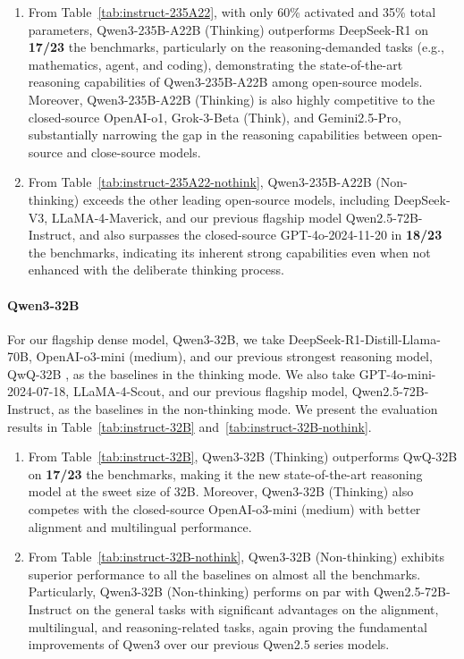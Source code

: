 \documentclass[dvipsnames]{article}
\begin{document}
\begin{enumerate}[label=(\arabic*)]
    \item From Table~\ref{tab:instruct-235A22}, with only 60\% activated and 35\% total parameters, Qwen3-235B-A22B (Thinking) outperforms DeepSeek-R1 on \textbf{17/23} the benchmarks, particularly on the reasoning-demanded tasks (e.g., mathematics, agent, and coding), demonstrating the state-of-the-art reasoning capabilities of Qwen3-235B-A22B among open-source models.
    Moreover, Qwen3-235B-A22B (Thinking) is also highly competitive to the closed-source OpenAI-o1, Grok-3-Beta (Think), and Gemini2.5-Pro, substantially narrowing the gap in the reasoning capabilities between open-source and close-source models.
    \item From Table~\ref{tab:instruct-235A22-nothink}, Qwen3-235B-A22B (Non-thinking) exceeds the other leading open-source models, including DeepSeek-V3, LLaMA-4-Maverick, and our previous flagship model Qwen2.5-72B-Instruct, and also surpasses the closed-source GPT-4o-2024-11-20 in \textbf{18/23} the benchmarks, indicating its inherent strong capabilities even when not enhanced with the deliberate thinking process.
\end{enumerate}

\paragraph{Qwen3-32B}
For our flagship dense model, Qwen3-32B, we take DeepSeek-R1-Distill-Llama-70B, OpenAI-o3-mini (medium), and our previous strongest reasoning model, QwQ-32B \citep{qwq32b}, as the baselines in the thinking mode.
We also take GPT-4o-mini-2024-07-18, LLaMA-4-Scout, and our previous flagship model, Qwen2.5-72B-Instruct, as the baselines in the non-thinking mode.
We present the evaluation results in Table~\ref{tab:instruct-32B} and~\ref{tab:instruct-32B-nothink}.

\begin{enumerate}[label=(\arabic*)]
    \item From Table~\ref{tab:instruct-32B}, Qwen3-32B (Thinking) outperforms QwQ-32B on \textbf{17/23} the benchmarks, making it the new state-of-the-art reasoning model at the sweet size of 32B.
    Moreover, Qwen3-32B (Thinking) also competes with the closed-source OpenAI-o3-mini (medium) with better alignment and multilingual performance.
    \item From Table~\ref{tab:instruct-32B-nothink}, Qwen3-32B (Non-thinking) exhibits superior performance to all the baselines on almost all the benchmarks.
    Particularly, Qwen3-32B (Non-thinking) performs on par with Qwen2.5-72B-Instruct on the general tasks with significant advantages on the alignment, multilingual, and reasoning-related tasks, again proving the fundamental improvements of Qwen3 over our previous Qwen2.5 series models.
\end{enumerate}
\end{document}

